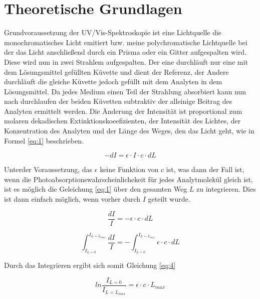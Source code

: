 %

%

\section{Theoretische Grundlagen}

Grundvoraussetzung der UV/Vis-Spektroskopie ist eine Lichtquelle die monochromatisches Licht emitiert bzw. meine polychromatische Lichtquelle bei der das Licht anschließend durch ein Prisma oder ein Gitter aufgespalten wird. Diese wird nun in zwei Strahlem aufgespalten. Der eine durchläuft nur eine mit dem Lösungsmittel gefüllten Küvette und dient der Referenz, der Andere durchläuft die gleiche Küvette jedoch gefüllt mit dem Analyten in dem Lösungsmittel. Da jedes Medium einen Teil der Strahlung absorbiert kann nun nach durchlaufen der beiden Küvetten subtraktiv der alleinige Beitrag des Analyten ermittelt werden. Die Änderung der Intensität ist proportional zum molaren dekadischen Extinktionskoeefizienten, der Intensität des Lichtes, der Konzentration des Analyten und der Länge des Weges, den das Licht geht, wie in Formel \ref{eq:1} beschrieben.

\begin {equation}
-dI=\epsilon \cdot I \cdot c \cdot dL
\label{eq:1}
\end {equation}

Unterder Voraussetzung, das $\epsilon$ keine Funktion von $c$ ist, was dann der Fall ist, wenn die Photoabsorptionswahrscheinlichekeit für jedes Analytmolekül gleich ist, ist es möglich die Geleichung \ref{eq:1} über den gesamten Weg $L$ zu integrieren. Dies ist dann einfach möglich, wenn vorher durch $I$ geteilt wurde.


\begin {equation}
\frac{dI}{I}=-\epsilon \cdot c \cdot dL
\label{eq:2}
\end{equation}

\begin {equation}
\int_{I_{L=0}}^{I_{L=L_{max}}}\frac{dI}{I}=-\int_{I_{L=0}}^{I_{L=L_{max}}}\epsilon \cdot c \cdot dL
\label{eq:3}
\end{equation}

Durch das Integrieren ergibt sich somit Gleichung \ref{eq:4}

\begin {equation}
ln \frac{{I_{L=0}}}{I_{L=L_{max}}}=\epsilon \cdot c \cdot L_{max}
\label{eq:4}
\end{equation}

